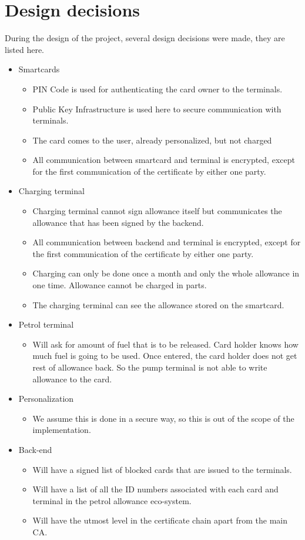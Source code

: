 \section*{Design decisions}
During the design of the project, several design decisions were made, they are listed here.
\begin{itemize}
\item Smartcards
\begin{itemize}
\item PIN Code is used for authenticating the card owner to the terminals.
\item Public Key Infrastructure is used here to secure communication with terminals.
\item The card comes to the user, already personalized, but not charged
\item All communication between smartcard and terminal is encrypted, except for the first communication of the certificate by either one party.
\end{itemize}

\item Charging terminal
\begin{itemize}
\item Charging terminal cannot sign allowance itself but communicates the allowance that has been signed by the backend.
\item All communication between backend and terminal is encrypted, except for the first communication of the certificate by either one party.
\item Charging can only be done once a month and only the whole allowance in one time. Allowance cannot be charged in parts.
\item The charging terminal can see the allowance stored on the smartcard.
\end{itemize}

\item Petrol terminal
\begin{itemize}
\item Will ask for amount of fuel that is to be released. Card holder knows how much fuel is going to be used. Once entered, the card holder does not get rest of allowance back. So the pump terminal is not able to write allowance to the card.
\end{itemize}

\item Personalization
\begin{itemize}
\item We assume this is done in a secure way, so this is out of the scope of the 
implementation.
\end{itemize}

 
\item Back-end
\begin{itemize}
	\item Will have a signed list of blocked cards that are issued to the terminals.
	\item Will have a list of all the ID numbers associated with each card and terminal in the petrol allowance eco-system.
	\item Will have the utmost level in the certificate chain apart from the main CA.
\end{itemize}
\end{itemize}
